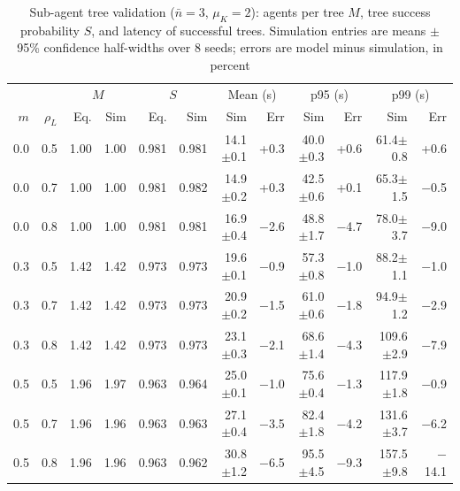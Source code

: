 \documentclass[journal]{IEEEtran}
\begin{document}
\begin{table}[t]
\caption{Sub-agent tree validation ($\bar n=3$, $\mu_K=2$): agents per tree $M$, tree success probability $S$, and latency of successful trees. Simulation entries are means $\pm$ 95\% confidence half-widths over 8 seeds; errors are model minus simulation, in percent}
\label{tab:tree}
\centering
\footnotesize
\setlength{\tabcolsep}{3.2pt}
\begin{tabular}{rrrrrrrrrrrr}
\toprule
 & & \multicolumn{2}{c}{$M$} & \multicolumn{2}{c}{$S$} & \multicolumn{2}{c}{Mean (s)} & \multicolumn{2}{c}{p95 (s)} & \multicolumn{2}{c}{p99 (s)} \\
\cmidrule(lr){3-4}\cmidrule(lr){5-6}\cmidrule(lr){7-8}\cmidrule(lr){9-10}\cmidrule(lr){11-12}
$m$ & $\rho_L$ & Eq. & Sim & Eq. & Sim & Sim & Err & Sim & Err & Sim & Err \\
\midrule
0.0 & 0.5 & 1.00 & 1.00 & 0.981 & 0.981 & 14.1$\pm$0.1 & +0.3 & 40.0$\pm$0.3 & +0.6 & 61.4$\pm$0.8 & +0.6 \\
0.0 & 0.7 & 1.00 & 1.00 & 0.981 & 0.982 & 14.9$\pm$0.2 & +0.3 & 42.5$\pm$0.6 & +0.1 & 65.3$\pm$1.5 & $-$0.5 \\
0.0 & 0.8 & 1.00 & 1.00 & 0.981 & 0.981 & 16.9$\pm$0.4 & $-$2.6 & 48.8$\pm$1.7 & $-$4.7 & 78.0$\pm$3.7 & $-$9.0 \\
\midrule
0.3 & 0.5 & 1.42 & 1.42 & 0.973 & 0.973 & 19.6$\pm$0.1 & $-$0.9 & 57.3$\pm$0.8 & $-$1.0 & 88.2$\pm$1.1 & $-$1.0 \\
0.3 & 0.7 & 1.42 & 1.42 & 0.973 & 0.973 & 20.9$\pm$0.2 & $-$1.5 & 61.0$\pm$0.6 & $-$1.8 & 94.9$\pm$1.2 & $-$2.9 \\
0.3 & 0.8 & 1.42 & 1.42 & 0.973 & 0.973 & 23.1$\pm$0.3 & $-$2.1 & 68.6$\pm$1.4 & $-$4.3 & 109.6$\pm$2.9 & $-$7.9 \\
\midrule
0.5 & 0.5 & 1.96 & 1.97 & 0.963 & 0.964 & 25.0$\pm$0.1 & $-$1.0 & 75.6$\pm$0.4 & $-$1.3 & 117.9$\pm$1.8 & $-$0.9 \\
0.5 & 0.7 & 1.96 & 1.96 & 0.963 & 0.963 & 27.1$\pm$0.4 & $-$3.5 & 82.4$\pm$1.8 & $-$4.2 & 131.6$\pm$3.7 & $-$6.2 \\
0.5 & 0.8 & 1.96 & 1.96 & 0.963 & 0.962 & 30.8$\pm$1.2 & $-$6.5 & 95.5$\pm$4.5 & $-$9.3 & 157.5$\pm$9.8 & $-$14.1 \\
\bottomrule
\end{tabular}
\end{table}
\end{document}
